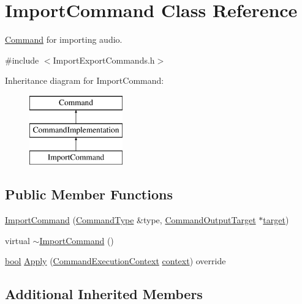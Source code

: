 \hypertarget{class_import_command}{}\section{Import\+Command Class Reference}
\label{class_import_command}


\hyperlink{class_command}{Command} for importing audio.  




{\ttfamily \#include $<$Import\+Export\+Commands.\+h$>$}

Inheritance diagram for Import\+Command\+:\begin{figure}[H]
\begin{center}
\leavevmode
\includegraphics[height=3.000000cm]{class_import_command}
\end{center}
\end{figure}
\subsection*{Public Member Functions}
\begin{DoxyCompactItemize}
\item 
\hyperlink{class_import_command_a9c2821ec61e4083cb94f0058d39f1ec7}{Import\+Command} (\hyperlink{class_command_type}{Command\+Type} \&type, \hyperlink{class_command_output_target}{Command\+Output\+Target} $\ast$\hyperlink{lib_2expat_8h_a15a257516a87decb971420e718853137}{target})
\item 
virtual \hyperlink{class_import_command_a5938776408c39fc22533739197770972}{$\sim$\+Import\+Command} ()
\item 
\hyperlink{mac_2config_2i386_2lib-src_2libsoxr_2soxr-config_8h_abb452686968e48b67397da5f97445f5b}{bool} \hyperlink{class_import_command_a0d480a672f1795d7a1eba987fe198e65}{Apply} (\hyperlink{class_command_execution_context}{Command\+Execution\+Context} \hyperlink{structcontext}{context}) override
\end{DoxyCompactItemize}
\subsection*{Additional Inherited Members}


